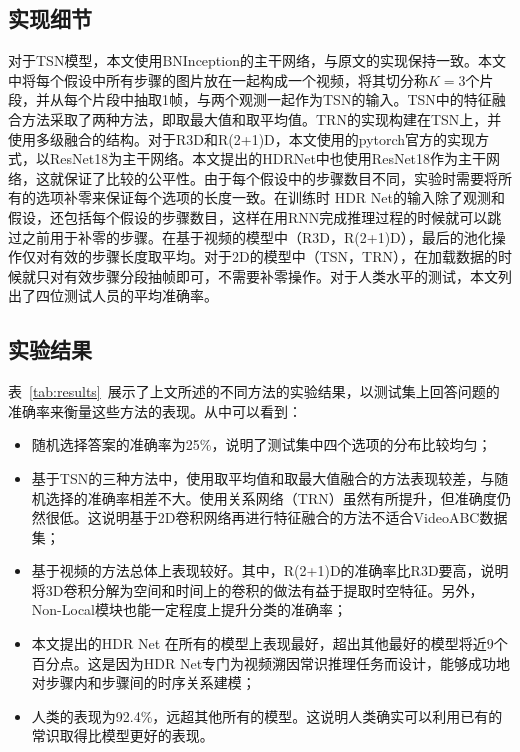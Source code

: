 \subsection{实现细节}
对于TSN模型，本文使用BNInception的主干网络，与原文的实现\cite{wang2016temporal}保持一致。本文中将每个假设中所有步骤的图片放在一起构成一个视频，将其切分称$K=3$个片段，并从每个片段中抽取1帧，与两个观测一起作为TSN的输入。TSN中的特征融合方法采取了两种方法，即取最大值和取平均值。TRN的实现构建在TSN上，并使用多级融合的结构\cite{zhou2018temporal}。对于R3D和R(2+1)D，本文使用的pytorch官方的实现方式，以ResNet18\cite{he2016deep}为主干网络。本文提出的HDRNet中也使用ResNet18作为主干网络，这就保证了比较的公平性。由于每个假设中的步骤数目不同，实验时需要将所有的选项补零来保证每个选项的长度一致。在训练时 HDR Net的输入除了观测和假设，还包括每个假设的步骤数目，这样在用RNN完成推理过程的时候就可以跳过之前用于补零的步骤。在基于视频的模型中（R3D，R(2+1)D），最后的池化操作仅对有效的步骤长度取平均。对于2D的模型中（TSN，TRN），在加载数据的时候就只对有效步骤分段抽帧即可，不需要补零操作。对于人类水平的测试，本文列出了四位测试人员的平均准确率。

\subsection{实验结果}
表~\ref{tab:results}~展示了上文所述的不同方法的实验结果，以测试集上回答问题的准确率来衡量这些方法的表现。从中可以看到：

\begin{itemize}
    \item 随机选择答案的准确率为25\%，说明了测试集中四个选项的分布比较均匀；
    \item 基于TSN的三种方法中，使用取平均值和取最大值融合的方法表现较差，与随机选择的准确率相差不大。使用关系网络（TRN）虽然有所提升，但准确度仍然很低。这说明基于2D卷积网络再进行特征融合的方法不适合VideoABC数据集；
    \item 基于视频的方法总体上表现较好。其中，R(2+1)D的准确率比R3D要高，说明将3D卷积分解为空间和时间上的卷积的做法有益于提取时空特征。另外，Non-Local模块也能一定程度上提升分类的准确率；
    \item 本文提出的HDR Net 在所有的模型上表现最好，超出其他最好的模型将近9个百分点。这是因为HDR Net专门为视频溯因常识推理任务而设计，能够成功地对步骤内和步骤间的时序关系建模；
    \item 人类的表现为92.4\%，远超其他所有的模型。这说明人类确实可以利用已有的常识取得比模型更好的表现。
\end{itemize}


